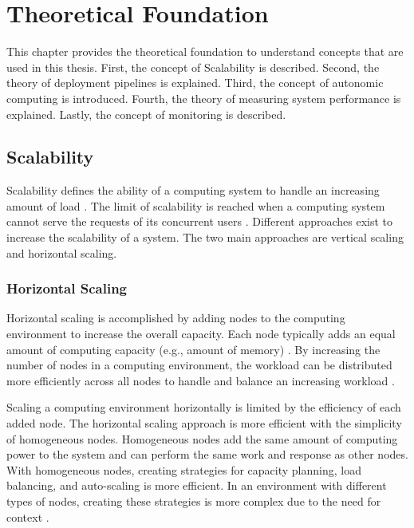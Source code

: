 \chapter{Theoretical Foundation}
\label{chap:02_foundation}


This chapter provides the theoretical foundation to understand concepts that are used in this thesis. First, the concept of Scalability is described. Second, the theory of deployment pipelines is explained. Third, the concept of autonomic computing is introduced. Fourth, the theory of measuring system performance is explained. Lastly, the concept of monitoring is described.


\section{Scalability}
\label{sec:02_foundations_scalability}
Scalability defines the ability of a computing system to handle an increasing amount of load \cite{Farcic2017Toolkit21}. 
The limit of scalability is reached when a computing system cannot serve the requests of its concurrent users \cite{Wilder2012CloudPatterns}.
Different approaches exist to increase the scalability of a system. The two main approaches are vertical scaling and horizontal scaling.


\subsection{Horizontal Scaling}
\label{subsec:02_foundations_scalability_horizontal-scaling}
Horizontal scaling is accomplished by adding nodes to the computing environment to increase the overall capacity.
Each node typically adds an equal amount of computing capacity (e.g., amount of memory) \cite{Wilder2012CloudPatterns}.
By increasing the number of nodes in a computing environment, the workload can be distributed more efficiently across all nodes to handle and balance an increasing workload \cite{Wilder2012CloudPatterns, Abbott2015ScalabilityArt}.


Scaling a computing environment horizontally is limited by the efficiency of each added node.
The horizontal scaling approach is more efficient with the simplicity of homogeneous nodes.
Homogeneous nodes add the same amount of computing power to the system and can perform the same work and response as other nodes.
With homogeneous nodes, creating strategies for capacity planning, load balancing, and auto-scaling is more efficient.
In an environment with different types of nodes, creating these strategies is more complex due to the need for context \cite{Wilder2012CloudPatterns}.


